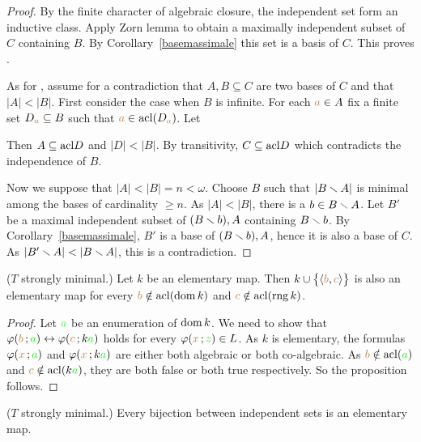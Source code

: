 \begin{proof}
  By the finite character of algebraic closure, the independent set form an inductive class.
  Apply Zorn lemma to obtain a maximally independent subset of $C$ containing $B$.
  By Corollary~\ref{basemassimale} this set is a basis of $C$.
  This proves .

  As for , assume for a contradiction that $A,B\subseteq C$ are two bases of $C$ and that $|A|<|B|$.
  First consider the case when $B$ is infinite.
  For each ${\color{brown} a}\in A$ fix a finite set $D_{\color{brown} a}\subseteq B$ such that ${\color{brown} a}\in{\rm acl}(D_{\color{brown} a})$.
  Let


  Then $A\subseteq{\rm acl} D$ and $|D|<|B|$.
  By transitivity, $C\subseteq{\rm acl} D$ which contradicts the independence of $B$.

  Now we suppose that $|A|<|B|=n<\omega$.
  Choose $B$ such that $|B\smallsetminus A|$ is minimal among the bases of cardinality $\ge n$.
  As $|A|<|B|$, there is a $b\in B\smallsetminus A$.
  Let $B'$ be a maximal independent subset of $(B\smallsetminus b),A$ containing $B\smallsetminus b$.
  By Corollary~\ref{basemassimale}, $B'$ is a base of $(B\smallsetminus b),A$, hence it is also a base of $C$.
  As $|B'\sm A|<|B\sm A|$, this is a contradiction.
\end{proof}

\begin{proposition}\label{prop_mappetraindipendenti}
  ($T$ strongly minimal.) 
  Let $k$ be an elementary map.
  Then $k\cup\big\{\langle{\color{brown}b},{\color{brown} c}\rangle\big\}$ is also an elementary map for every ${\color{brown} b}\notin{\rm acl}(\mathop{\rm dom} k)$ and ${\color{brown} c}\notin{\rm acl}(\mathop{\rm rng} k)$.
\end{proposition}
\begin{proof}
  Let ${\color{green} a}$ be an enumeration of $\mathop{\rm dom} k$.
  We need to show that $\varphi({\color{brown} b}\,;{\color{green} a})\leftrightarrow\varphi({\color{brown} c}\,;k{\color{green} a})$ holds for every $\varphi({\color{brown} x}\,;{\color{green} z})\in L$.
  As $k$ is elementary, the formulas $\varphi({\color{brown} x}\,;{\color{green} a})$ and $\varphi({\color{brown} x}\,;k{\color{green} a})$ are either both algebraic or both co-algebraic.
  As ${\color{brown} b}\notin{\rm acl}({\color{green} a})$ and ${\color{brown} c}\notin{\rm acl}(k{\color{green} a})$, they are both false or both true respectively.
  So the proposition follows.
\end{proof}

\begin{corollary}\label{corol_mappetraindipendenti} 
  ($T$ strongly minimal.)
  Every bijection between independent sets is an elementary map.
\end{corollary}

